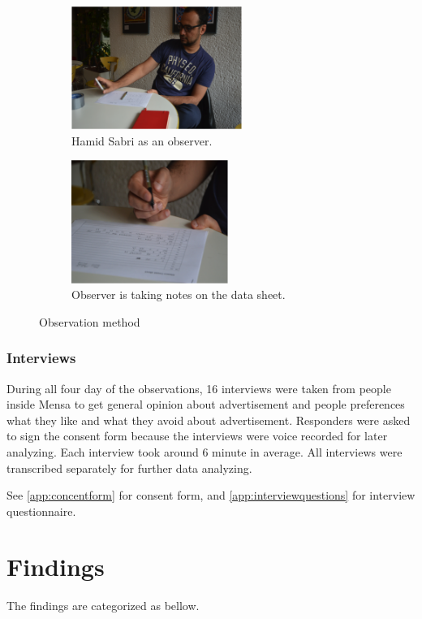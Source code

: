 \begin{figure}[H]
    \centering
    \begin{subfigure}[H]{0.45\textwidth}
        \centering
        \includegraphics[width=\textwidth,height=4cm]{Figures/3/hamid}
        \caption{Hamid Sabri as an observer.}
        \label{fig:hamid}
    \end{subfigure}
    \begin{subfigure}[H]{0.45\textwidth}
        \centering
        \includegraphics[width=\textwidth,height=4cm]{Figures/3/observer}
        \caption{Observer is taking notes on the data sheet.}
        \label{fig:Observer}
    \end{subfigure}
    \caption{Observation method}
    \label{fig:observation_env}
\end{figure}


\subsubsection{Interviews}
During all four day of the observations, 16 interviews were taken from people inside Mensa to get general opinion about advertisement and people preferences what they like and what they avoid about advertisement. Responders were asked to sign the consent form because the interviews were voice recorded for later analyzing.  Each interview took around 6 minute in average. All interviews were transcribed separately for further data analyzing.

See \ref{app:concentform} for consent form, and \ref{app:interviewquestions} for interview questionnaire.




\section{Findings}
The findings are categorized as bellow.


